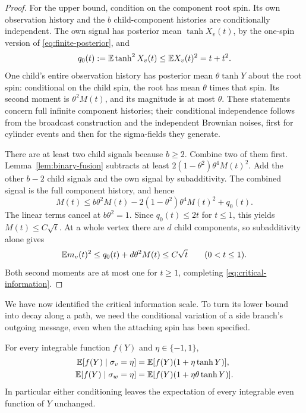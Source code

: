\begin{proof}
For the upper bound, condition on the component root spin.
Its own observation history and the \(b\) child-component histories
are conditionally independent.  The own signal has posterior mean
\(\tanh X_v(t)\), by the one-spin version of
\eqref{eq:finite-posterior}, and
\[
 q_0(t):=\mathbb E\tanh^2X_v(t)\le\mathbb E X_v(t)^2=t+t^2.
\]
One child's entire observation history has posterior mean
\(\theta\tanh Y\) about the root spin: conditional on the child spin,
the root has mean \(\theta\) times that spin.  Its second moment is
\(\theta^2M(t)\), and its magnitude is at most \(\theta\).
These statements concern full infinite component histories; their
conditional independence follows from the broadcast construction and
the independent Brownian noises, first for cylinder events and then
for the sigma-fields they generate.

There are at least two child signals because \(b\ge2\).  Combine two
of them first.  Lemma~\ref{lem:binary-fusion} subtracts at least
\(2(1-\theta^2)\theta^4M(t)^2\).  Add the other \(b-2\) child
signals and the own signal by subadditivity.  The combined signal is
the full component history, and hence
\[
 M(t)\le b\theta^2M(t)
       -2(1-\theta^2)\theta^4M(t)^2+q_0(t).
\]
The linear terms cancel at \(b\theta^2=1\).  Since \(q_0(t)\le2t\)
for \(t\le1\), this yields \(M(t)\le C\sqrt t\).
At a whole vertex there are \(d\) child components, so subadditivity
alone gives
\[
 \mathbb E m_v(t)^2\le q_0(t)+d\theta^2M(t)\le C\sqrt t
 \qquad(0<t\le1).
\]
Both second moments are at most one for \(t\ge1\), completing
\eqref{eq:critical-information}.
\end{proof}

We have now identified the critical information scale.  To turn its
lower bound into decay along a path, we need the conditional variation
of a side branch's outgoing message, even when the attaching spin has
been specified.

\begin{lemma}
\label{lem:component-spin-tilts}
For every integrable function \(f(Y)\) and
\(\eta\in\{-1,1\}\),
\begin{equation}
\label{eq:component-field-tilts}
 \begin{aligned}
 \mathbb E[f(Y)\mid\sigma_v=\eta]
   &=\mathbb E[f(Y)(1+\eta\tanh Y)],\\
 \mathbb E[f(Y)\mid\sigma_w=\eta]
   &=\mathbb E[f(Y)(1+\eta\theta\tanh Y)].
 \end{aligned}
\end{equation}
In particular either conditioning leaves the expectation of every
integrable even function of \(Y\) unchanged.
\end{lemma}

